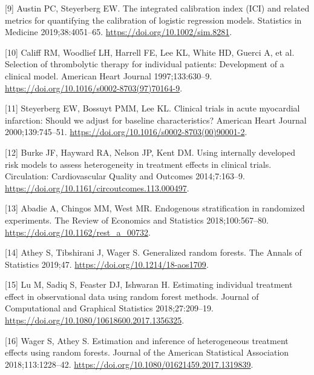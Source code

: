 \documentclass{article}
\newenvironment{cslreferences}%
  {}%
  {\par}
\begin{document}
\begin{cslreferences}
\leavevmode\hypertarget{ref-Austin2019}{}%
{[}9{]} Austin PC, Steyerberg EW. The integrated calibration index (ICI)
and related metrics for quantifying the calibration of logistic
regression models. Statistics in Medicine 2019;38:4051--65.
\url{https://doi.org/10.1002/sim.8281}.

\leavevmode\hypertarget{ref-Califf1997}{}%
{[}10{]} Califf RM, Woodlief LH, Harrell FE, Lee KL, White HD, Guerci A,
et al. Selection of thrombolytic therapy for individual patients:
Development of a clinical model. American Heart Journal 1997;133:630--9.
\url{https://doi.org/10.1016/s0002-8703(97)70164-9}.

\leavevmode\hypertarget{ref-Steyerberg2000}{}%
{[}11{]} Steyerberg EW, Bossuyt PMM, Lee KL. Clinical trials in acute
myocardial infarction: Should we adjust for baseline characteristics?
American Heart Journal 2000;139:745--51.
\url{https://doi.org/10.1016/s0002-8703(00)90001-2}.

\leavevmode\hypertarget{ref-Burke2014}{}%
{[}12{]} Burke JF, Hayward RA, Nelson JP, Kent DM. Using internally
developed risk models to assess heterogeneity in treatment effects in
clinical trials. Circulation: Cardiovascular Quality and Outcomes
2014;7:163--9. \url{https://doi.org/10.1161/circoutcomes.113.000497}.

\leavevmode\hypertarget{ref-Abadie2018}{}%
{[}13{]} Abadie A, Chingos MM, West MR. Endogenous stratification in
randomized experiments. The Review of Economics and Statistics
2018;100:567--80. \url{https://doi.org/10.1162/rest_a_00732}.

\leavevmode\hypertarget{ref-Athey2019}{}%
{[}14{]} Athey S, Tibshirani J, Wager S. Generalized random forests. The
Annals of Statistics 2019;47. \url{https://doi.org/10.1214/18-aos1709}.

\leavevmode\hypertarget{ref-Lu2018}{}%
{[}15{]} Lu M, Sadiq S, Feaster DJ, Ishwaran H. Estimating individual
treatment effect in observational data using random forest methods.
Journal of Computational and Graphical Statistics 2018;27:209--19.
\url{https://doi.org/10.1080/10618600.2017.1356325}.

\leavevmode\hypertarget{ref-Wager2018}{}%
{[}16{]} Wager S, Athey S. Estimation and inference of heterogeneous
treatment effects using random forests. Journal of the American
Statistical Association 2018;113:1228--42.
\url{https://doi.org/10.1080/01621459.2017.1319839}.
\end{cslreferences}

\setlength{\parindent}{0in}
\setlength{\leftskip}{0in}

\noindent



\end{document}
